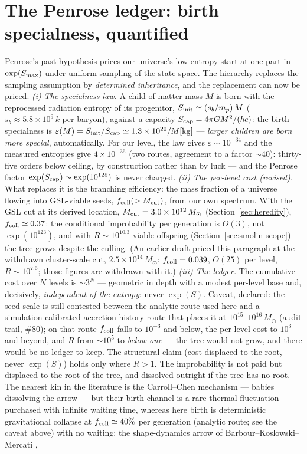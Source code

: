 \documentclass[11pt]{article}
\begin{document}
\section{The Penrose ledger: birth specialness, quantified}\label{sec:penrose}
Penrose's past hypothesis \cite{Penrose1979} prices our universe's low-entropy start at one part in $\exp(S_{\rm max})$ under uniform sampling of the state space. The hierarchy replaces the sampling assumption by \emph{determined inheritance}, and the replacement can now be priced. \emph{(i) The specialness law.} A child of matter mass $M$ is born with the reprocessed radiation entropy of its progenitor, $S_{\rm init} \simeq (s_b/m_p)\,M$ ($s_b \approx 5.8\times10^{9}\,k$ per baryon), against a capacity $S_{\rm cap} = 4\pi G M^2/(\hbar c)$: the birth specialness is $\varepsilon(M) = S_{\rm init}/S_{\rm cap} \simeq 1.3\times10^{20}/M[\mathrm{kg}]$ --- \emph{larger children are born more special}, automatically. For our level, the law gives $\varepsilon \sim 10^{-34}$ and the measured entropies give $4\times10^{-36}$ (two routes, agreement to a factor $\sim$40): thirty-five orders below ceiling, by construction rather than by luck --- and the Penrose factor $\exp(S_{\rm cap}) \sim \exp(10^{125})$ is never charged. \emph{(ii) The per-level cost (revised).} What replaces it is the branching efficiency: the mass fraction of a universe flowing into GSL-viable seeds, $f_{\rm coll}(>M_{\rm cut})$, from our own spectrum. With the GSL cut at its derived location, $M_{\rm cut} = 3.0\times10^{12}\,M_\odot$ (Section~\ref{sec:heredity}), $f_{\rm coll} \simeq 0.37$: the conditional improbability per generation is $O(3)$, not $\exp(10^{123})$, and with $R \sim 10^{10.3}$ viable offspring (Section~\ref{sec:smolin-scope}) the tree grows despite the culling. (An earlier draft priced this paragraph at the withdrawn cluster-scale cut, $2.5\times10^{14}\,M_\odot$: $f_{\rm coll} = 0.039$, $O(25)$ per level, $R \sim 10^{7.6}$; those figures are withdrawn with it.) \emph{(iii) The ledger.} The cumulative cost over $N$ levels is $\sim 3^{N}$ --- geometric in depth with a modest per-level base and, decisively, \emph{independent of the entropy}: never $\exp(S)$. Caveat, declared: the seed scale is still contested between the analytic route used here and a simulation-calibrated accretion-history route that places it at $10^{15}$--$10^{16}\,M_\odot$ (audit trail, \#80); on that route $f_{\rm coll}$ falls to $10^{-3}$ and below, the per-level cost to $10^{3}$ and beyond, and $R$ from $\sim10^{5}$ to \emph{below one} --- the tree would not grow, and there would be no ledger to keep. The structural claim (cost displaced to the root, never $\exp(S)$) holds only where $R > 1$. The improbability is not paid but displaced to the root of the tree, and dissolved outright if the tree has no root. The nearest kin in the literature is the Carroll--Chen mechanism \cite{CarrollChen} --- babies dissolving the arrow --- but their birth channel is a rare thermal fluctuation purchased with infinite waiting time, whereas here birth is deterministic gravitational collapse at $f_{\rm coll} \simeq 40\%$ per generation (analytic route; see the caveat above) with no waiting; the shape-dynamics arrow of Barbour--Koslowski--Mercati \cite{BKM2014}, 
\end{document}
